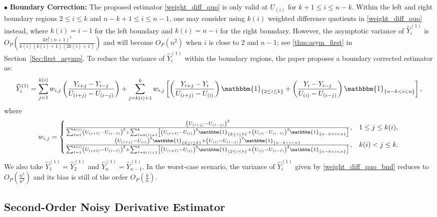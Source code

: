 \documentclass{uwstat572}
\theoremstyle{definition}
\renewcommand{\hat}{\widehat}
\theoremstyle{theorem}
\begin{document}
$\bullet$ {\bf Boundary Correction:} The proposed estimator \eqref{weight_diff_quo} is only valid at $U_{(i)}$ for $k+1\leq i \leq n-k$. Within the left and right boundary regions $2\leq i \leq k$ and $n-k+1\leq i \leq n-1$, one may consider using $k(i)$ weighted difference quotients in \eqref{weight_diff_quo} instead, where $k(i)=i-1$ for the left boundary and $k(i)=n-i$ for the right boundary. However, the asymptotic variance of $\hat{Y}_i^{(1)}$ is $O_P\left(\frac{3\sigma_e^2 (n+1)^2}{k(i)(k(i)+1)(2k(i)+1)}\right)$ and will become $O_P(n^2)$ when $i$ is close to 2 and $n-1$; see \autoref{thm:asym_first} in Section~\ref{Sec:first_asymp}. To reduce the variance of $\hat{Y}_i^{(1)}$ within the boundary regions, the paper proposes a boundary corrected estimator as:
\begin{equation}
\label{weight_diff_quo_bnd}
\hat{Y}_i^{(1)} = \sum_{j=1}^{k(i)} w_{i,j} \left(\frac{Y_{i+j} - Y_{i-j}}{U_{(i+j)} - U_{(i-j)}}\right) + \sum_{j=k(i)+1}^k w_{i,j} \left[\left(\frac{Y_{i+j} - Y_i}{U_{(i+j)} - U_{(i)}}\right) \mathbbm{1}_{\{2\leq i\leq k\}} + \left(\frac{Y_i - Y_{i-j}}{U_{(i)} - U_{(i-j)}}\right) \mathbbm{1}_{\{n-k< i< n\}} \right],
\end{equation}
where 
\[
w_{i,j} = \begin{cases}
\frac{\left(U_{(i+j)} - U_{(i-j)}\right)^2}{\sum_{\ell=1}^{k(i)} \left(U_{(i+\ell)} - U_{(i-\ell)}\right)^2 + \sum_{\ell=k(i)+1}^k \left[\left(U_{(i+\ell)} - U_{(i)}\right)^2 \mathbbm{1}_{\{2\leq i\leq k\}} + \left(U_{(i)} - U_{(i-\ell)}\right)^2 \mathbbm{1}_{\{n-k< i< n\}} \right]}, & 1\leq j\leq k(i),\\
\frac{\left(U_{(i+j)} - U_{(i)}\right)^2 \mathbbm{1}_{\{2\leq i\leq k\}} + \left(U_{(i)} - U_{(i-j)}\right)^2 \mathbbm{1}_{\{n-k < i < n\}}}{\sum_{\ell=1}^{k(i)} \left(U_{(i+\ell)} - U_{(i-\ell)}\right)^2 + \sum_{\ell=k(i)+1}^k \left[\left(U_{(i+\ell)} - U_{(i)}\right)^2 \mathbbm{1}_{\{2\leq i\leq k\}} + \left(U_{(i)} - U_{(i-\ell)}\right)^2 \mathbbm{1}_{\{n-k< i< n\}} \right]}, & k(i)< j\leq k.
\end{cases}
\]
We also take $\hat{Y}_1^{(1)} = \hat{Y}_2^{(1)}$ and $\hat{Y}_n^{(1)} = \hat{Y}_{n-1}^{(1)}$. In the worst-case scenario, the variance of $\hat{Y}_i^{(1)}$ given by \eqref{weight_diff_quo_bnd} reduces to $O_P\left(\frac{n^2}{k^2}\right)$ and its bias is still of the order $O_P\left(\frac{k}{n}\right)$. 


\subsection{Second-Order Noisy Derivative Estimator}
\end{document}
